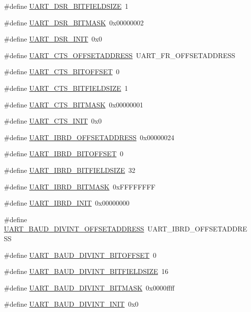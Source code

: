 \begin{DoxyCompactItemize}
\#define \hyperlink{a00575_ace40f3c42c422574204b4ae84ce99b23}{UART\_\-DSR\_\-BITFIELDSIZE}~1
\item 
\#define \hyperlink{a00575_abdb0e3a72a190bf82834485e989aae1d}{UART\_\-DSR\_\-BITMASK}~0x00000002
\item 
\#define \hyperlink{a00575_a71dc273fbf1d378acaeba01dac7a22f6}{UART\_\-DSR\_\-INIT}~0x0
\item 
\#define \hyperlink{a00575_a4b94615376df71462116032aeff49634}{UART\_\-CTS\_\-OFFSETADDRESS}~UART\_\-FR\_\-OFFSETADDRESS
\item 
\#define \hyperlink{a00575_ae268aad023771a3288f193235c2f3301}{UART\_\-CTS\_\-BITOFFSET}~0
\item 
\#define \hyperlink{a00575_aed166ab8f128972a231114ac6c6d3cae}{UART\_\-CTS\_\-BITFIELDSIZE}~1
\item 
\#define \hyperlink{a00575_aed80bfe6d93554e6b7cb1b837ef90609}{UART\_\-CTS\_\-BITMASK}~0x00000001
\item 
\#define \hyperlink{a00575_ac849b8d30b41a0c713f60740140d3d6b}{UART\_\-CTS\_\-INIT}~0x0
\item 
\#define \hyperlink{a00575_ad76a582a387254611af239e438c7e86a}{UART\_\-IBRD\_\-OFFSETADDRESS}~0x00000024
\item 
\#define \hyperlink{a00575_ae7e5bc120726d8ec96f68016a1a63cf9}{UART\_\-IBRD\_\-BITOFFSET}~0
\item 
\#define \hyperlink{a00575_ac2ef42108ba4b06a9b4e78565e95dc87}{UART\_\-IBRD\_\-BITFIELDSIZE}~32
\item 
\#define \hyperlink{a00575_a1a31e5a7154f670fd8bd38f15a4dab4e}{UART\_\-IBRD\_\-BITMASK}~0xFFFFFFFF
\item 
\#define \hyperlink{a00575_afb17ea23dc1a14bbabae92b61fd0dc40}{UART\_\-IBRD\_\-INIT}~0x00000000
\item 
\#define \hyperlink{a00575_a4c74e1e2474d2c696f60a5ba3fd2d24e}{UART\_\-BAUD\_\-DIVINT\_\-OFFSETADDRESS}~UART\_\-IBRD\_\-OFFSETADDRESS
\item 
\#define \hyperlink{a00575_af93aea7e65be6cb53f4ec6616c464b89}{UART\_\-BAUD\_\-DIVINT\_\-BITOFFSET}~0
\item 
\#define \hyperlink{a00575_a1e851079e9b09a0a5981a77acc4257c5}{UART\_\-BAUD\_\-DIVINT\_\-BITFIELDSIZE}~16
\item 
\#define \hyperlink{a00575_aea370ff321d350bf8bf6c948cf1c6cde}{UART\_\-BAUD\_\-DIVINT\_\-BITMASK}~0x0000ffff
\item 
\#define \hyperlink{a00575_a6599d4a3e918f80e4ea7cefb7b4f27c7}{UART\_\-BAUD\_\-DIVINT\_\-INIT}~0x0
\item 

\end{DoxyCompactItemize}

